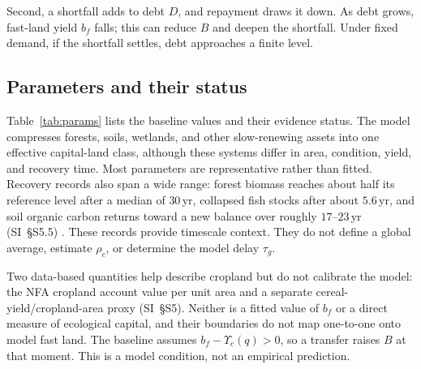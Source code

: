 \documentclass[preprint,12pt,authoryear]{elsarticle}
\newcommand{\Ups}{\Upsilon_c}
\begin{document}
Second, a shortfall adds to debt $D$, and repayment draws it down. As debt grows, fast-land yield $b_f$ falls; this can reduce $B$ and deepen the shortfall. Under fixed demand, if the shortfall settles, debt approaches a finite level.

\subsection{Parameters and their status}\label{sec:params}

Table~\ref{tab:params} lists the baseline values and their evidence status. The model compresses forests, soils, wetlands, and other slow-renewing assets into one effective capital-land class, although these systems differ in area, condition, yield, and recovery time. Most parameters are representative rather than fitted. Recovery records also span a wide range: forest biomass reaches about half its reference level after a median of $30$\,yr, collapsed fish stocks after about $5.6$\,yr, and soil organic carbon returns toward a new balance over roughly $17$--$23$\,yr (SI~\S S5.5) \citep{Poorter2016,HutchingsReynolds2004,Neubauer2013,Poeplau2011}. These records provide timescale context. They do not define a global average, estimate $\rho_c$, or determine the model delay $\tau_g$.

Two data-based quantities help describe cropland but do not calibrate the model: the NFA cropland account value per unit area and a separate cereal-yield/cropland-area proxy (SI~\S S5). Neither is a fitted value of $b_f$ or a direct measure of ecological capital, and their boundaries do not map one-to-one onto model fast land. The baseline assumes $b_f-\Ups(q)>0$, so a transfer raises $B$ at that moment. This is a model condition, not an empirical prediction.
\end{document}
